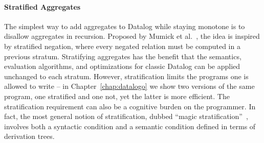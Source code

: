  \paragraph*{\bf Stratified Aggregates}
 The simplest way to add aggregates to Datalog while staying monotone
  is to disallow aggregates in recursion.
 Proposed by Mumick et al.~\cite{DBLP:conf/vldb/MumickPR90}, the idea is inspired by stratified negation,
  where every negated relation must be computed in a previous stratum.
 Stratifying aggregates has the benefit that the semantics,
  evaluation algorithms, and optimizations for classic Datalog
  can be applied unchanged to each stratum.
 However, stratification limits the programs one is allowed to write --
   in Chapter~\ref{chap:datalogo} we show two versions of the same program, 
   one stratified and one not, yet the latter is more efficient.
 The stratification requirement can also be a cognitive burden on the programmer.
 In fact, the most general notion of stratification, dubbed ``magic stratification''~\cite{DBLP:conf/vldb/MumickPR90}, involves both a syntactic condition and a semantic condition defined
  in terms of derivation trees.
 
